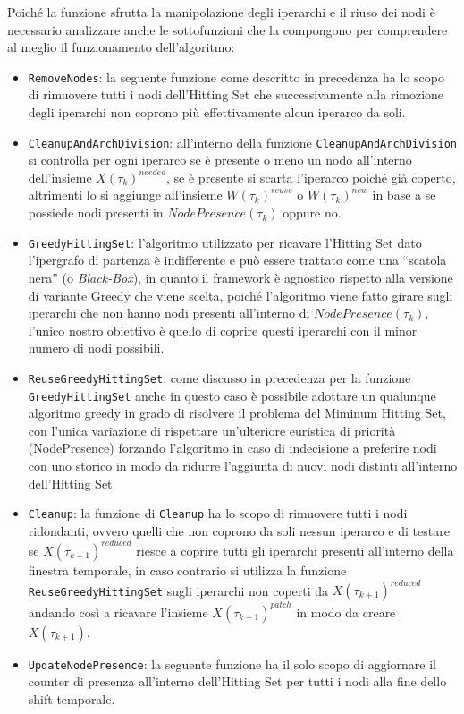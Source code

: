 Poiché la funzione sfrutta la manipolazione degli iperarchi e il riuso dei nodi è necessario analizzare anche le sottofunzioni che la compongono per comprendere al meglio il funzionamento dell'algoritmo:
\begin{itemize}
    \item \texttt{RemoveNodes}: la seguente funzione come descritto in precedenza ha lo scopo di rimuovere tutti i nodi dell'Hitting Set che successivamente alla rimozione degli iperarchi non coprono più effettivamente alcun iperarco da soli.
    \item \texttt{CleanupAndArchDivision}: all'interno della funzione \texttt{CleanupAndArchDivision} si controlla per ogni iperarco se è presente o meno un nodo all'interno dell'insieme $X(\tau_k)^{needed}$, se è presente si scarta l'iperarco poiché già coperto, altrimenti lo si aggiunge all'insieme $W(\tau_k)^{reuse}$ o $W(\tau_k)^{new}$ in base a se possiede nodi presenti in $NodePresence(\tau_k)$ oppure no.
    \item \texttt{GreedyHittingSet}: l'algoritmo utilizzato per ricavare l'Hitting Set dato l'ipergrafo di partenza è indifferente e può essere trattato come una ``scatola nera'' (o \textit{Black-Box}), in quanto il framework è agnostico rispetto alla versione di variante Greedy che viene scelta, poiché l'algoritmo viene fatto girare sugli iperarchi che non hanno nodi presenti all'interno di $NodePresence(\tau_k)$, l'unico nostro obiettivo è quello di coprire questi iperarchi con il minor numero di nodi possibili. 
    \item \texttt{ReuseGreedyHittingSet}: come discusso in precedenza per la funzione \texttt{GreedyHittingSet} anche in questo caso è possibile adottare un qualunque algoritmo greedy in grado di risolvere il problema del Miminum Hitting Set, con l'unica variazione di rispettare un'ulteriore euristica di priorità (NodePresence) forzando l'algoritmo in caso di indecisione a preferire nodi con uno storico in modo da ridurre l'aggiunta di nuovi nodi distinti all'interno dell'Hitting Set.
    \item \texttt{Cleanup}: la funzione di \texttt{Cleanup} ha lo scopo di rimuovere tutti i nodi ridondanti, ovvero quelli che non coprono da soli nessun iperarco e di testare se $X(\tau_{k+1})^{reduced}$ riesce a coprire tutti gli iperarchi presenti all'interno della finestra temporale, in caso contrario si utilizza la funzione \texttt{ReuseGreedyHittingSet} sugli iperarchi non coperti da $X(\tau_{k+1})^{reduced}$ andando così a ricavare l'insieme $X{(\tau_{k+1})}^{patch}$ in modo da creare $X{(\tau_{k+1})}$.
    \item \texttt{UpdateNodePresence}: la seguente funzione ha il solo scopo di aggiornare il counter di presenza all'interno dell'Hitting Set per tutti i nodi alla fine dello shift temporale.
\end{itemize}


